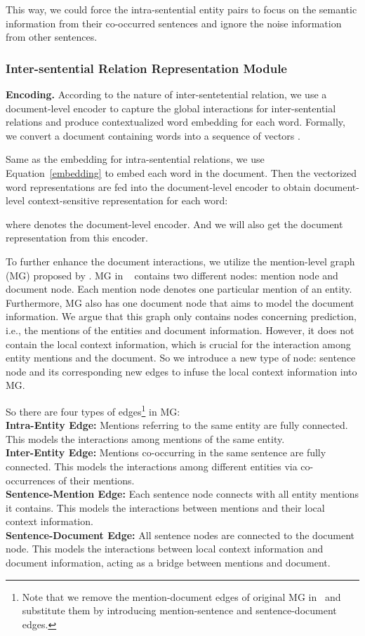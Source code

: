 \documentclass[11pt,a4paper]{article}
\begin{document}
This way, we could force the intra-sentential entity pairs to focus on the semantic information from their co-occurred sentences and ignore the noise information from other sentences.



\subsubsection{Inter-sentential Relation Representation Module\label{sssec:inter}}

\textbf{Encoding.} According to the nature of inter-sentetential relation, we use a document-level encoder to capture the global interactions for inter-sentential relations and produce contextualized word embedding for each word. Formally, we convert a document  containing  words   into a sequence of vectors .

Same as the embedding for intra-sentential relations, we use Equation~\ref{embedding} to embed each word in the document. Then the vectorized word representations are fed into the document-level encoder to obtain document-level context-sensitive representation for each word:

where  denotes the document-level encoder. And we will also get the document representation  from this encoder.

To further enhance the document interactions, we utilize the mention-level graph (MG) proposed by \citet{GAIN}. MG in ~\citet{GAIN} contains two different nodes: mention node and document node. Each mention node denotes one particular mention of an entity. Furthermore, MG also has one document node that aims to model the document information. We argue that this graph only contains nodes concerning prediction, i.e., the mentions of the entities and document information. However, it does not contain the local context information, which is crucial for the interaction among entity mentions and the document. So we introduce a new type of node: sentence node and its corresponding new edges to infuse the local context information into MG.

So there are four types of edges\footnote{Note that we remove the mention-document edges of original MG in~\citep{GAIN} and substitute them by introducing mention-sentence and sentence-document edges.} in MG: \\
\noindent
\textbf{Intra-Entity Edge:} Mentions referring to the same entity are fully connected. This models the interactions among mentions of the same entity.\\
\noindent
\textbf{Inter-Entity Edge:} Mentions co-occurring in the same sentence are fully connected. This models the interactions among different entities via co-occurrences of their mentions. \\
\noindent
\textbf{Sentence-Mention Edge:} Each sentence node connects with all entity mentions it contains. This models the interactions between mentions and their local context information. \\
\noindent
\textbf{Sentence-Document Edge:} All sentence nodes are connected to the document node. This models the interactions between local context information and document information, acting as a bridge between mentions and document.
\end{document}
